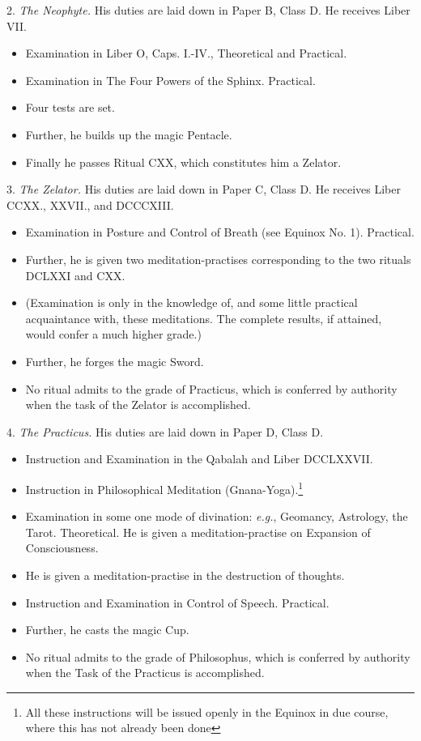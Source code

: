 2. \textit{The Neophyte.} His duties are laid down in Paper B, Class D. He receives Liber VII.
\begin{itemize}
\item Examination in Liber O, Caps. I.-IV., Theoretical and Practical.
\item Examination in The Four Powers of the Sphinx. Practical.
\item Four tests are set.
\item Further, he builds up the magic Pentacle.
\item Finally he passes Ritual CXX, which constitutes him a Zelator.
\end{itemize}

3. \textit{The Zelator.} His duties are laid down in Paper C, Class D. He receives Liber CCXX., XXVII., and DCCCXIII.
\begin{itemize}
\item Examination in Posture and Control of Breath (see Equinox No. 1). Practical.
\item Further, he is given two meditation-practises corresponding to the two rituals DCLXXI and CXX.
\item (Examination is only in the knowledge of, and some little practical acquaintance with, these meditations. The complete results, if attained, would confer a much higher grade.)
\item Further, he forges the magic Sword.
\item No ritual admits to the grade of Practicus, which is conferred by authority when the task of the Zelator is accomplished.
\end{itemize}

4. \textit{The Practicus.} His duties are laid down in Paper D, Class D.
\begin{itemize}
\item Instruction and Examination in the Qabalah and Liber DCCLXXVII.
\item Instruction in Philosophical Meditation (Gnana-Yoga).\footnote{All these instructions will be issued openly in the Equinox in due course, where this has not already been done}
\item Examination in some one mode of divination: \textit{e.g.}, Geomancy, Astrology, the Tarot. Theoretical. He is given a meditation-practise on Expansion of Consciousness.
\item He is given a meditation-practise in the destruction of thoughts.
\item Instruction and Examination in Control of Speech. Practical.
\item Further, he casts the magic Cup.
\item No ritual admits to the grade of Philosophus, which is conferred by authority when the Task of the Practicus is accomplished.
\end{itemize}

